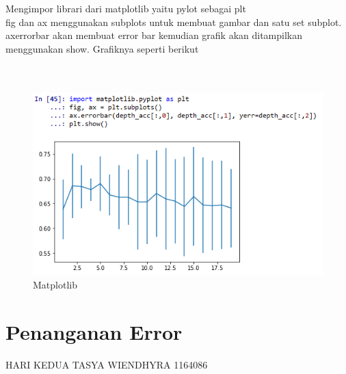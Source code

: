\begin{enumerate}
\par
Mengimpor librari dari matplotlib yaitu pylot sebagai plt\\
fig dan ax menggunakan subplots untuk membuat gambar dan satu set subplot.\\
axerrorbar akan membuat error bar
kemudian grafik akan ditampilkan menggunakan show. Grafiknya seperti berikut
\\
\\
\\
\begin{figure}[ht]
\centering
\includegraphics[scale=0.5]{figures/spyder12.png}
\caption{Matplotlib}
\label{Spyder}
\end{figure}
\end{enumerate}


\section{Penanganan Error}
HARI KEDUA TASYA WIENDHYRA 1164086
